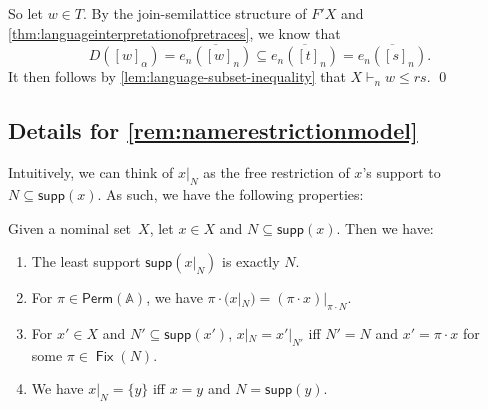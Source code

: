 \documentclass[a4paper,UKenglish,cleveref,thm-restate,numberwithinsect,final]{lipics-v2021}
\newcommand{\Perm}{\mathsf{Perm}(\Names)}
\newcommand{\Names}{\mathbb{A}}
\newcommand{\supp}{\mathsf{supp}}
\newcommand{\Fix}{\mathop{\mathsf{Fix}}}
\theoremstyle{plain}
\numberwithin{equation}{section}
\newcommand{\+}[1]{\mathcal{#1}\xspace}
\theoremstyle{definition}
\begin{document}
So let \(w \in T\).
By the join-semilattice structure of \(F' X\) and \cref{thm:languageinterpretationofpretraces}, we know that
\begin{equation*}
  D([w]_\alpha) = \overline{e_n([w]_n)} \subseteq \overline{e_n([t]_n)} = \overline{e_n([s]_n)}.
\end{equation*}
It then follows by \cref{lem:language-subset-inequality} that
\(X \vdash_n w \le rs\).  \qed

\subsection{Details for \cref{rem:namerestrictionmodel}}
\label{sec:tdrop-details}

Intuitively, we can think of $x|_N$ as the free restriction of $x$'s support to $N \subseteq \supp(x)$.
As such, we have the following properties:
\begin{lemma}
  \label{lem:restrictionproperties}
  Given a nominal set~$X$, let $x \in X$ and $N \subseteq \supp(x)$. Then we have:
  \begin{enumerate}
    \item \label{itm:restrictionsupp} The least support $\supp(x|_N)$ is exactly $N$.
    \item \label{itm:restrictionequivariant} For $\pi \in \Perm$, we have $\pi \cdot (x|_N) = (\pi \cdot x)|_{\pi \cdot N}$.
    \item \label{itm:restrictioneq} For $x' \in X$ and $N' \subseteq \supp(x')$, $x|_N = x'|_{N'}$ iff $N' = N$ and $x' = \pi \cdot x$ for some $\pi \in \Fix(N)$.
    \item \label{itm:restrictionsingle} We have $x|_N = \{y\}$ iff $x = y$ and $N = \supp(y)$.
  \end{enumerate}
\end{lemma}
\end{document}

